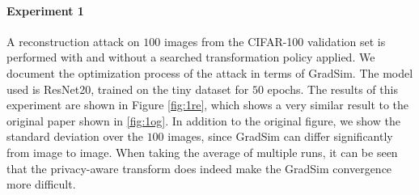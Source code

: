 \paragraph{Experiment 1} A reconstruction attack on $100$ images from the CIFAR-100 validation set is performed with and without a searched transformation policy applied. We document the optimization process of the attack in terms of GradSim. The model used is ResNet20, trained on the tiny dataset for $50$ epochs. The results of this experiment are shown in Figure \ref{fig:1re}, which shows a very similar result to the original paper shown in \ref{fig:1og}. In addition to the original figure, we show the standard deviation over the $100$ images, since GradSim can differ significantly from image to image. When taking the average of multiple runs, it can be seen that the privacy-aware transform does indeed make the GradSim convergence more difficult.
\setcounter{figure}{-1}    
\begin{figure}[h]
        \centering
        \label{fig:1}
\end{figure}
\setcounter{figure}{0} 
